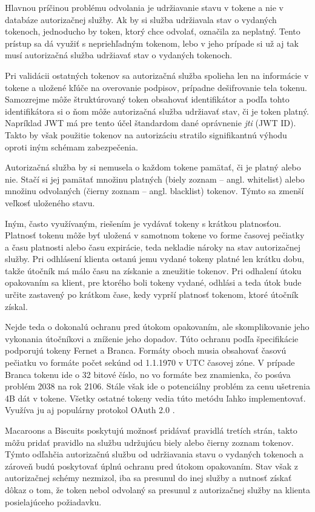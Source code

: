 Hlavnou príčinou problému odvolania je udržiavanie stavu v tokene a nie v databáze autorizačnej služby. Ak by si služba udržiavala stav o vydaných tokenoch, jednoducho by token, ktorý chce odvolať, označila za neplatný. Tento prístup sa dá využiť s nepriehľadným tokenom, lebo v jeho prípade si už aj tak musí autorizačná služba udržiavať stav o vydaných tokenoch.

Pri validácii ostatných tokenov sa autorizačná služba spolieha len na informácie v tokene a uložené kľúče na overovanie podpisov, prípadne dešifrovanie tela tokenu. Samozrejme môže štruktúrovaný token obsahovať identifikátor a podľa tohto identifikátora si o ňom môže autorizačná služba udržiavať stav, či je token platný. Napríklad JWT má pre tento účel štandardom dané oprávnenie \textit{jti} (JWT ID). Takto by však použitie tokenov na autorizáciu stratilo signifikantnú výhodu oproti iným schémam zabezpečenia.

Autorizačná služba by si nemusela o každom tokene pamätať, či je platný alebo nie. Stačí si jej pamätať množinu platných (biely zoznam -- angl. whitelist) alebo množinu odvolaných (čierny zoznam -- angl. blacklist) tokenov. Týmto sa zmenší veľkosť uloženého stavu.

Iným, často využívaným, riešením je vydávať tokeny s krátkou platnosťou. Platnosť tokenu môže byť uložená v samotnom tokene vo forme časovej pečiatky a času platnosti alebo času expirácie, teda nekladie nároky na stav autorizačnej služby. Pri odhlásení klienta ostanú jemu vydané tokeny platné len krátku dobu, takže útočník má málo času na získanie a zneužitie tokenov. Pri odhalení útoku opakovaním sa klient, pre ktorého boli tokeny vydané, odhlási a teda útok bude určite zastavený po krátkom čase, kedy vyprší platnosť tokenom, ktoré útočník získal.

Nejde teda o dokonalú ochranu pred útokom opakovaním, ale skomplikovanie jeho vykonania útočníkovi a zníženie jeho dopadov. Túto ochranu podľa špecifikácie podporujú tokeny Fernet a Branca. Formáty oboch musia obsahovať časovú pečiatku vo formáte počet sekúnd od 1.1.1970 v UTC časovej zóne. V prípade Branca tokenu ide o 32 bitové číslo, no vo formáte bez znamienka, čo posúva problém 2038 \cite{epoch_end} na rok 2106. Stále však ide o potenciálny problém za cenu ušetrenia 4B dát v tokene. Všetky ostatné tokeny vedia túto metódu ľahko implementovať. Využíva ju aj populárny protokol OAuth 2.0 \cite{oauth2}.

Macaroons a Biscuits poskytujú možnosť pridávať pravidlá tretích strán, takto môžu pridať pravidlo na službu udržujúcu biely alebo čierny zoznam tokenov. Týmto odľahčia autorizačnú službu od udržiavania stavu o vydaných tokenoch a zároveň budú poskytovať úplnú ochranu pred útokom opakovaním. Stav však z autorizačnej schémy nezmizol, iba sa presunul do inej služby a nutnosť získať dôkaz o tom, že token nebol odvolaný sa presunul z autorizačnej služby na klienta posielajúceho požiadavku.



